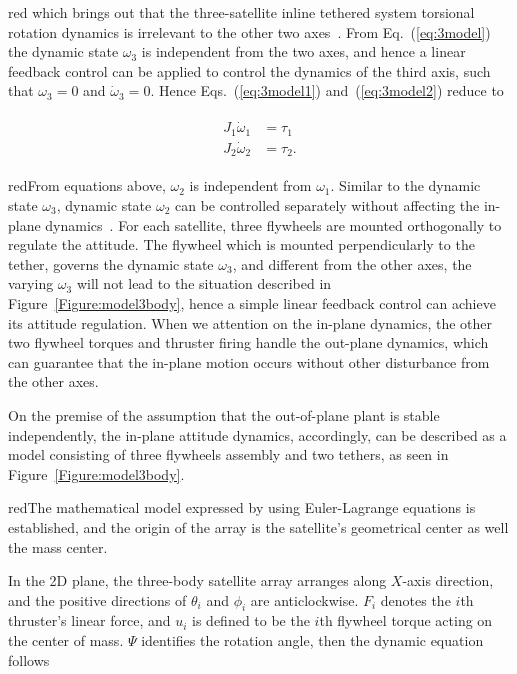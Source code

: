 \begin{color}{red}
which brings out that the three-satellite inline tethered system torsional rotation dynamics is irrelevant to the other two axes~\cite{chung2008propellant1}. From Eq.~(\ref{eq:3model}) the dynamic state $\omega_3$ is independent from the two axes, and hence a linear feedback control can be applied to control the dynamics of the third axis, such that $\omega_3=0$ and $\dot\omega_3 = 0$. Hence Eqs.~(\ref{eq:3model1}) and~(\ref{eq:3model2}) reduce to
\end{color}
\begin{align}
\begin{split}
J_1\dot\omega_1&=\tau_1\\
J_2\dot\omega_2&=\tau_2.
\end{split}
\end{align} \begin{color}{red}From equations above, $\omega_2$ is independent from $\omega_1$. Similar to the dynamic state $\omega_3$, dynamic state $\omega_2$ can be controlled separately without affecting the in-plane dynamics~\cite{chung2007nonlinear,chung2007nonlinear1,chung2007nonlinear3}. For each satellite, three flywheels are mounted orthogonally to regulate the attitude. The flywheel which is mounted perpendicularly to the tether, governs the dynamic state $\omega_3$, and different from the other axes, the varying $\omega_3$ will not lead to the situation described in Figure~\ref{Figure:model3body}, hence a simple linear feedback control can achieve its attitude regulation. When we attention on the in-plane dynamics, the other two flywheel torques and thruster firing handle the out-plane dynamics, which can guarantee that the in-plane motion occurs without other disturbance from the other axes.\end{color} On the premise of the assumption that the out-of-plane plant is stable independently, the in-plane attitude dynamics, accordingly, can be described as a model consisting of three flywheels assembly and two tethers, as seen in Figure~\ref{Figure:model3body}. \begin{color}{red}The mathematical model expressed by using Euler-Lagrange equations is established, and the origin of the array is the satellite's geometrical center as well the mass center.\end{color} In the 2D plane, the three-body satellite array arranges along $X$-axis direction, and the positive directions of $\theta_i$ and $\phi_i$ are anticlockwise. $F_i$ denotes the $i$th thruster's linear force, and $u_i$ is defined to be the $i$th flywheel torque acting on the center of mass. $\Psi$ identifies the rotation angle, then the dynamic equation follows~\cite{chung2007nonlinear1}
